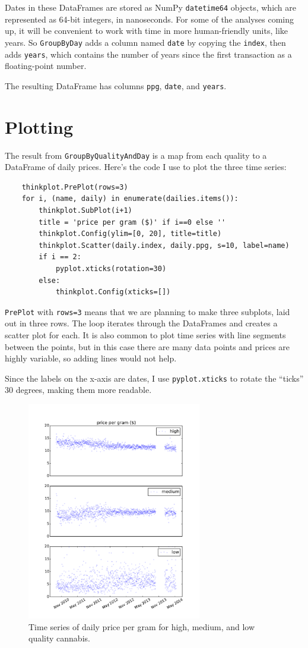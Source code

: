 \documentclass[12pt]{book}
\begin{document}
Dates in these DataFrames are stored as NumPy {\tt datetime64}
objects, which are represented as 64-bit integers, in nanoseconds.
For some of the analyses coming up, it will be convenient to
work with time in more human-friendly units, like years.  So
{\tt GroupByDay} adds a column named {\tt date} by copying
the {\tt index}, then adds {\tt years}, which contains the number
of years since the first transaction as a floating-point number.

The resulting DataFrame has columns {\tt ppg}, {\tt date}, and
{\tt years}.

\section{Plotting}

The result from {\tt GroupByQualityAndDay} is a map from each quality
to a DataFrame of daily prices.  Here's the code I use to plot
the three time series:

\begin{verbatim}
    thinkplot.PrePlot(rows=3)
    for i, (name, daily) in enumerate(dailies.items()):
        thinkplot.SubPlot(i+1)
        title = 'price per gram ($)' if i==0 else ''
        thinkplot.Config(ylim=[0, 20], title=title)
        thinkplot.Scatter(daily.index, daily.ppg, s=10, label=name)
        if i == 2: 
            pyplot.xticks(rotation=30)
        else:
            thinkplot.Config(xticks=[])
\end{verbatim}

{\tt PrePlot} with {\tt rows=3} means that we are planning to
make three subplots, laid out in three rows.  The loop iterates
through the DataFrames and creates a scatter plot for each.  It is
also common to plot time series with line segments between the points,
but in this case there are many data points and prices are highly
variable, so adding lines would not help.

Since the labels on the x-axis are dates, I use {\tt pyplot.xticks}
to rotate the ``ticks'' 30 degrees, making them more readable.

\begin{figure}
\centerline{\includegraphics[width=3in]{figs/timeseries1.pdf}}
\caption{Time series of daily price per gram for high, medium, and low
quality cannabis.}
\label{timeseries1}
\end{figure}
\end{document}
